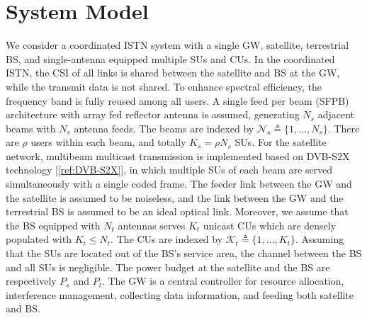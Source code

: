 \documentclass[draftclsnofoot, onecolumn, comsoc, 12pt]{IEEEtran}
\begin{document}
\section{System Model}
We consider a coordinated ISTN system with a single GW, satellite, terrestrial BS, and single-antenna equipped multiple SUs and CUs. %
In the coordinated ISTN, the CSI of all links is shared between the satellite and BS at the GW, while the transmit data is not shared. 
To enhance spectral efficiency, the frequency band is fully reused among all users. 
A single feed per beam (SFPB) architecture with array fed reflector antenna is assumed, generating $N_{s}$ adjacent beams with $N_{s}$ antenna feeds. 
The beams are indexed by $\mathcal{N}_{s} \triangleq \{1,...,N_{s}\}$. 
There are $\rho$ users within each beam, and totally $K_{s}=\rho N_{s}$ SUs. 
For the satellite network,  multibeam multicast transmission is implemented based on DVB-S2X technology \mbox{[\ref{ref:DVB-S2X}]}, in which multiple SUs of each beam are served simultaneously with a single coded frame.
%
The feeder link between the GW and the satellite is assumed to be noiseless, and the link between the GW and the terrestrial BS is assumed to be an ideal optical link. 
Moreover, we assume that the BS equipped with $N_{t}$ antennas serves $K_{t}$ unicast CUs which are densely populated with  $K_{t} \leq N_{t}$. 
The CUs are indexed by $\mathcal{K}_{t} \triangleq \{1,...,K_{t}\}$. Assuming that the SUs are located out of the BS's service area, the channel between the BS and all SUs is negligible. 
The power budget at the satellite and the BS are respectively $P_{s}$ and $P_{t}$.
The GW is a central controller for resource allocation, interference management, collecting data information, and feeding both satellite and BS.
\end{document}
